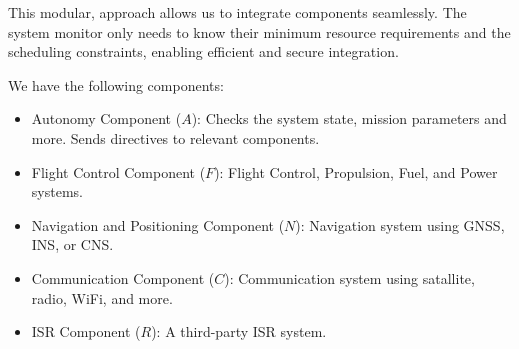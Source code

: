 This modular, approach allows us to integrate components seamlessly. 
The system monitor only needs to know their minimum resource requirements and the scheduling constraints, enabling efficient and secure integration.

We have the following components:
\begin{itemize}
	\item Autonomy Component ($A$): Checks the system state, mission parameters and more. Sends directives to relevant components.
	\item Flight Control Component ($F$): Flight Control, Propulsion, Fuel, and Power systems.
	\item Navigation and Positioning Component ($N$): Navigation system using GNSS, INS, or CNS. 
	\item Communication Component ($C$): Communication system using satallite, radio, WiFi, and more.
	\item ISR Component ($R$): A third-party ISR system.
\end{itemize}

